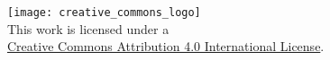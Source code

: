 %
%

\pubmode
	\onecolumngrid
\fi

\vspace*{180pt}
\begin{center}
	\texttt{[image: creative\_commons\_logo]}\\
	This work is licensed under a\\ \href{http://creativecommons.org/licenses/by/4.0/}{Creative Commons Attribution 4.0 International License}.
\end{center}
\newpage

\pubmode
	\twocolumngrid
\fi